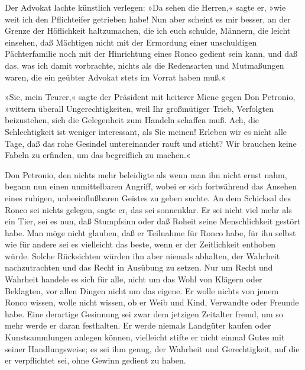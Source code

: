 Der Advokat lachte künstlich verlegen: »Da sehen die Herren,« sagte
er, »wie weit ich den Pflichteifer getrieben habe! Nun aber scheint
es mir besser, an der Grenze der Höflichkeit haltzumachen, die ich
euch schulde, Männern, die leicht einsehen, daß Mächtigen nicht mit
der Ermordung einer unschuldigen Pächterfamilie noch mit der
Hinrichtung eines Ronco gedient sein kann, und daß das, was ich
damit vorbrachte, nichts als die Redensarten und Mutmaßungen waren,
die ein geübter Advokat stets im Vorrat haben muß.«

»Sie, mein Teurer,« sagte der Präsident mit heiterer Miene gegen
Don Petronio, »wittern überall Ungerechtigkeiten, weil Ihr
großmütiger Trieb, Verfolgten beizustehen, sich die Gelegenheit zum
Handeln schaffen muß. Ach, die Schlechtigkeit ist weniger
interessant, als Sie meinen! Erleben wir es nicht alle Tage, daß
das rohe Gesindel untereinander rauft und sticht? Wir brauchen
keine Fabeln zu erfinden, um das begreiflich zu machen.«

Don Petronio, den nichts mehr beleidigte als wenn man ihn nicht
ernst nahm, begann nun einen unmittelbaren Angriff, \pagenum{[77]}
wobei er sich fortwährend das Ansehen eines ruhigen,
unbeeinflußbaren Geistes zu geben suchte. An dem Schicksal des
Ronco sei nichts gelegen, sagte er, das sei sonnenklar. Er sei
nicht viel mehr als ein Tier, sei es nun, daß Stumpfsinn oder daß
Roheit seine Menschlichkeit gestört habe. Man möge nicht glauben,
daß er Teilnahme für Ronco habe, für ihn selbst wie für andere sei
es vielleicht das beste, wenn er der Zeitlichkeit enthoben würde.
Solche Rücksichten würden ihn aber niemals abhalten, der Wahrheit
nachzutrachten und das Recht in Ausübung zu setzen. Nur um Recht
und Wahrheit handele es sich für alle, nicht um das Wohl von
Klägern oder Beklagten, vor allen Dingen nicht um das eigene. Er
wolle nichts von jenem Ronco wissen, wolle nicht wissen, ob er Weib
und Kind, Verwandte oder Freunde habe. Eine derartige Gesinnung sei
zwar dem jetzigen Zeitalter fremd, um so mehr werde er daran
festhalten. Er werde niemals Landgüter kaufen oder Kunstsammlungen
anlegen können, vielleicht stifte er nicht einmal Gutes mit seiner
Handlungsweise; es sei ihm genug, der Wahrheit und Gerechtigkeit,
auf die er verpflichtet sei, ohne Gewinn gedient zu haben.


